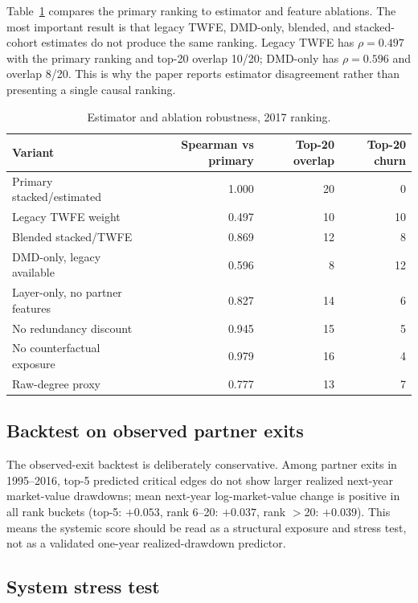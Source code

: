 \documentclass[11pt,letterpaper]{article}
\begin{document}
Table~\ref{tab:robust} compares the primary ranking to estimator and
feature ablations.  The most important result is that legacy TWFE,
DMD-only, blended, and stacked-cohort estimates do not produce the same
ranking.  Legacy TWFE has $\rho=0.497$ with the primary ranking and
top-20 overlap 10/20; DMD-only has $\rho=0.596$ and overlap 8/20.
This is why the paper reports estimator disagreement rather than
presenting a single causal ranking.

\begin{table}[H]
\centering
\footnotesize
\caption{Estimator and ablation robustness, 2017 ranking.}
\label{tab:robust}
\begin{tabular}{lrrr}
\toprule
Variant & Spearman vs primary & Top-20 overlap & Top-20 churn \\
\midrule
Primary stacked/estimated       & 1.000 & 20 &  0 \\
Legacy TWFE weight              & 0.497 & 10 & 10 \\
Blended stacked/TWFE            & 0.869 & 12 &  8 \\
DMD-only, legacy available      & 0.596 &  8 & 12 \\
Layer-only, no partner features & 0.827 & 14 &  6 \\
No redundancy discount          & 0.945 & 15 &  5 \\
No counterfactual exposure      & 0.979 & 16 &  4 \\
Raw-degree proxy                & 0.777 & 13 &  7 \\
\bottomrule
\end{tabular}
\end{table}

\subsection{Backtest on observed partner exits}

The observed-exit backtest is deliberately conservative.  Among
partner exits in 1995--2016, top-5 predicted critical edges do not show
larger realized next-year market-value drawdowns; mean next-year
log-market-value change is positive in all rank buckets (top-5:
$+0.053$, rank 6--20: $+0.037$, rank $>$20: $+0.039$).  This means
the systemic score should be read as a structural exposure and stress
test, not as a validated one-year realized-drawdown predictor.

\subsection{System stress test}
\end{document}
